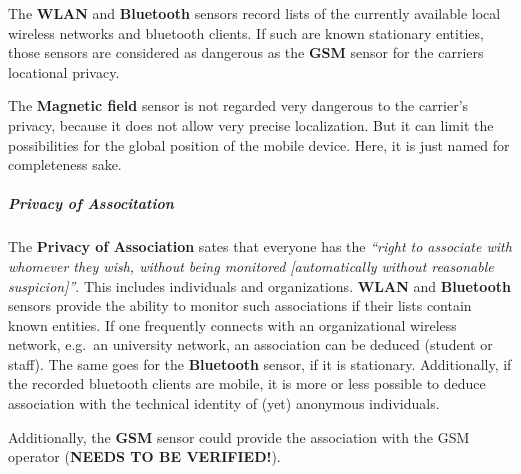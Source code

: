 The \textbf{WLAN} and \textbf{Bluetooth} sensors record lists of the
currently available local wireless networks and bluetooth clients. If
such are known stationary entities, those sensors are considered as
dangerous as the \textbf{GSM} sensor for the carriers locational
privacy.

The \textbf{Magnetic field} sensor is not regarded very dangerous to the
carrier's privacy, because it does not allow very precise localization.
But it can limit the possibilities for the global position of the mobile
device. Here, it is just named for completeness sake.

\subparagraph{Privacy of Associtation}

The \textbf{Privacy of Association} sates that everyone has the
\emph{``right to associate with whomever they wish, without being
monitored [automatically without reasonable suspicion]''}. This
includes individuals and organizations. \textbf{WLAN} and
\textbf{Bluetooth} sensors provide the ability to monitor such
associations if their lists contain known entities. If one frequently
connects with an organizational wireless network, e.g.~an university
network, an association can be deduced (student or staff). The same goes
for the \textbf{Bluetooth} sensor, if it is stationary. Additionally, if
the recorded bluetooth clients are mobile, it is more or less possible
to deduce association with the technical identity of (yet) anonymous
individuals.

Additionally, the \textbf{GSM} sensor could provide the association with
the GSM operator (\textbf{NEEDS TO BE VERIFIED!}).

%

